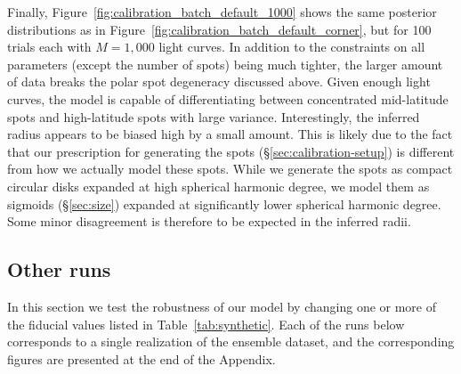 \documentclass[modern]{aastex62}
\begin{document}
Finally, Figure~\ref{fig:calibration_batch_default_1000} shows
the same posterior distributions as in Figure~\ref{fig:calibration_batch_default_corner},
but for 100 trials each with $M=1{,}000$ light curves. In addition to the
constraints on all parameters (except the number of spots) being much
tighter, the larger amount of data breaks the polar spot degeneracy discussed
above. Given enough light curves, the model is capable of differentiating between
concentrated mid-latitude spots and high-latitude spots with large variance.
Interestingly, the inferred radius appears to be biased high by a small amount.
This is likely due to the fact that our prescription for
generating the spots (\S\ref{sec:calibration-setup}) is different from how
we actually model these spots. While we generate the spots as compact
circular disks expanded at high spherical harmonic degree, we model them
as sigmoids (\S\ref{sec:size}) expanded at significantly lower spherical
harmonic degree. Some minor disagreement is therefore to be expected in the inferred
radii.

\subsection{Other runs}
In this section we test the robustness of our model by changing one or
more of the fiducial values listed in Table~\ref{tab:synthetic}.
Each of the runs below corresponds to a single realization of the ensemble
dataset, and the corresponding figures are presented at the end of the Appendix.
\end{document}
